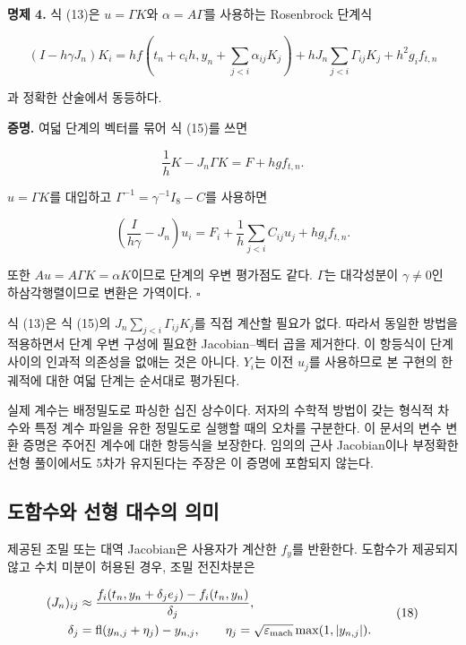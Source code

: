 \documentclass[
  10pt,
  dvipsnames]{article}
\begin{document}
\textbf{명제 4.} 식 (13)은 \(u=\Gamma K\)와 \(\alpha=A\Gamma\)를
사용하는 Rosenbrock 단계식

\[
 (I-h\gamma J_n)K_i
 =h f\!\left(t_n+c_i h,y_n+\sum_{j<i}\alpha_{ij}K_j\right)
 +hJ_n\sum_{j<i}\Gamma_{ij}K_j+h^2g_if_{t,n}
 \tag{15}
\]

과 정확한 산술에서 동등하다.

\textbf{증명.} 여덟 단계의 벡터를 묶어 식 (15)를 쓰면

\[
 \frac1hK-J_n\Gamma K=F+hgf_{t,n}.
 \tag{16}
\]

\(u=\Gamma K\)를 대입하고 \(\Gamma^{-1}=\gamma^{-1}I_8-C\)를 사용하면

\[
 \left(\frac{I}{h\gamma}-J_n\right)u_i
 =F_i+\frac1h\sum_{j<i}C_{ij}u_j+hg_if_{t,n}.
 \tag{17}
\]

또한 \(A u=A\Gamma K=\alpha K\)이므로 단계의 우변 평가점도 같다.
\(\Gamma\)는 대각성분이 \(\gamma\ne0\)인 하삼각행렬이므로 변환은
가역이다. \(\square\)

식 (13)은 식 (15)의 \(J_n\sum_{j<i}\Gamma_{ij}K_j\)를 직접 계산할 필요가
없다. 따라서 동일한 방법을 적용하면서 단계 우변 구성에 필요한
Jacobian--벡터 곱을 제거한다. 이 항등식이 단계 사이의 인과적 의존성을
없애는 것은 아니다. \(Y_i\)는 이전 \(u_j\)를 사용하므로 본 구현의 한
궤적에 대한 여덟 단계는 순서대로 평가된다.

실제 계수는 배정밀도로 파싱한 십진 상수이다. 저자의 수학적 방법이 갖는
형식적 차수와 특정 계수 파일을 유한 정밀도로 실행할 때의 오차를
구분한다. 이 문서의 변수 변환 증명은 주어진 계수에 대한 항등식을
보장한다. 임의의 근사 Jacobian이나 부정확한 선형 풀이에서도 5차가
유지된다는 주장은 이 증명에 포함되지 않는다.

\hypertarget{uxb3c4uxd568uxc218uxc640-uxc120uxd615-uxb300uxc218uxc758-uxc758uxbbf8}{%
\subsection{도함수와 선형 대수의
의미}\label{uxb3c4uxd568uxc218uxc640-uxc120uxd615-uxb300uxc218uxc758-uxc758uxbbf8}}

제공된 조밀 또는 대역 Jacobian은 사용자가 계산한 \(f_y\)를 반환한다.
도함수가 제공되지 않고 수치 미분이 허용된 경우, 조밀 전진차분은

\[
 \begin{aligned}
 (J_n)_{ij}&\approx
 \frac{f_i(t_n,y_n+\delta_j e_j)-f_i(t_n,y_n)}{\delta_j},\\
 \delta_j&=\operatorname{fl}(y_{n,j}+\eta_j)-y_{n,j},\qquad
 \eta_j=\sqrt{\varepsilon_{\rm mach}}\max(1,|y_{n,j}|).
 \end{aligned}
 \tag{18}
\]
\end{document}
